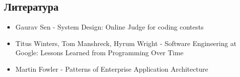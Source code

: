 

\subsection{Литература}
\begin{itemize}
    \item Gaurav Sen - System Design: Online Judge for coding contests
    \item Titus Winters, Tom Manshreck, Hyrum Wright - Software Engineering at Google: Lessons Learned from Programming Over Time
    \item Martin Fowler - Patterns of Enterprise Application Architecture
\end{itemize}

\listoffigures